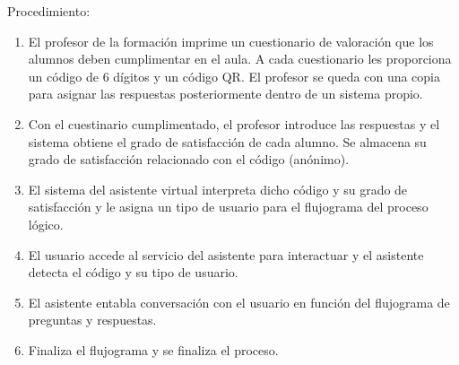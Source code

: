 Procedimiento:

\begin{enumerate}
    \item El profesor de la formación imprime un cuestionario de valoración que los alumnos deben cumplimentar en el aula. A cada cuestionario les proporciona un código de 6 dígitos y un código QR. El profesor se queda con una copia para asignar las respuestas posteriormente dentro de un sistema propio.
    \item Con el cuestinario cumplimentado, el profesor introduce las respuestas y el sistema obtiene el grado de satisfacción de cada alumno. Se almacena su grado de satisfacción relacionado con el código (anónimo).
    \item El sistema del asistente virtual interpreta dicho código y su grado de satisfacción y le asigna un tipo de usuario para el flujograma del proceso lógico.
    \item El usuario accede al servicio del asistente para interactuar y el asistente detecta el código y su tipo de usuario.
    \item El asistente entabla conversación con el usuario en función del flujograma de preguntas y respuestas.
    \item Finaliza el flujograma y se finaliza el proceso.
\end{enumerate}